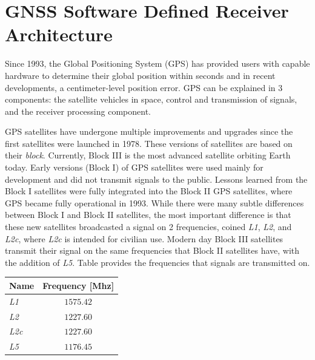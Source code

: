 \chapter{GNSS Software Defined Receiver Architecture}
Since 1993, the Global Positioning System (GPS) has provided users with capable hardware to determine their global position within seconds and in recent developments, a centimeter-level position error. GPS can be explained in 3 components: the satellite vehicles in space, control and transmission of signals, and the receiver processing component.

GPS satellites have undergone multiple improvements and upgrades since the first satellites were launched in 1978. These versions of satellites are based on their \textit{block}. Currently, Block III is the most advanced satellite orbiting Earth today. Early versions (Block I) of GPS satellites were used mainly for development and did not transmit signals to the public. Lessons learned from the Block I satellites were fully integrated into the Block II GPS satellites, where GPS became fully operational in 1993. While there were many subtle differences between Block I and Block II satellites, the most important difference is that these new satellites broadcasted a signal on 2 frequencies, coined \textit{L1}, \textit{L2}, and \textit{L2c}, where \textit{L2c} is intended for civilian use. Modern day Block III satellites transmit their signal on the same frequencies that Block II satellites have, with the addition of \textit{L5}. Table provides the frequencies that signals are transmitted on.

\begin{table}[h!]\label{tbl:GPSfreq}
    \centering
    \begin{tabular}{lc}
        \toprule
        \textbf{Name} & \textbf{Frequency [Mhz]} \\
        \midrule
        \textit{L1}   & \(1575.42\)              \\
        \textit{L2}   & \(1227.60\)              \\
        \textit{L2c}  & \(1227.60\)              \\
        \textit{L5}   & \(1176.45\)              \\
        \bottomrule
    \end{tabular}
\end{table}

